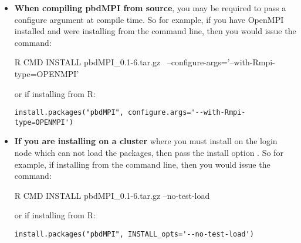 \begin{itemize}
  \item \textbf{When compiling pbdMPI from source}, you may be required to pass a configure argument at compile time.  So for example, if you have OpenMPI installed and were installing from the command line, then you would issue the command:
\begin{Code}
R CMD INSTALL pbdMPI_0.1-6.tar.gz \
        --configure-args='--with-Rmpi-type=OPENMPI'
\end{Code}
  or if installing from R:
  \begin{lstlisting}[language=rr]
install.packages("pbdMPI", configure.args='--with-Rmpi-type=OPENMPI')
\end{lstlisting}

  \item \textbf{If you are installing on a cluster} where you must install on the login node which can not load the packages, then pass the install option .    So for example, if installing from the command line, then you would issue the command:
\begin{Code}
R CMD INSTALL pbdMPI_0.1-6.tar.gz --no-test-load
\end{Code}
  or if installing from R:
  \begin{lstlisting}[language=rr]
install.packages("pbdMPI", INSTALL_opts='--no-test-load')
\end{lstlisting}
  
\end{itemize}
